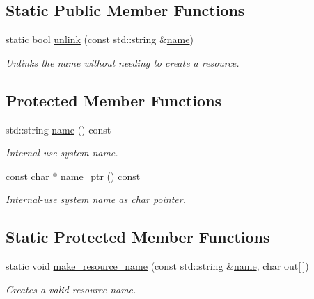 \subsection*{Static Public Member Functions}
\begin{DoxyCompactItemize}
\item 
static bool \hyperlink{classcpen333_1_1process_1_1impl_1_1named__resource__base_a47a1396cf7c8210e76431a4ba4725146}{unlink} (const std\+::string \&\hyperlink{classcpen333_1_1process_1_1impl_1_1named__resource__base_ae0c5fbb1843afe863cece4b51c38f807}{name})
\begin{DoxyCompactList}\small\item\em Unlinks the name without needing to create a resource. \end{DoxyCompactList}\end{DoxyCompactItemize}
\subsection*{Protected Member Functions}
\begin{DoxyCompactItemize}
\item 
std\+::string \hyperlink{classcpen333_1_1process_1_1impl_1_1named__resource__base_ae0c5fbb1843afe863cece4b51c38f807}{name} () const
\begin{DoxyCompactList}\small\item\em Internal-\/use system name. \end{DoxyCompactList}\item 
const char $\ast$ \hyperlink{classcpen333_1_1process_1_1impl_1_1named__resource__base_af4f2889b26cf33d0d5ed794b7e4097ab}{name\+\_\+ptr} () const
\begin{DoxyCompactList}\small\item\em Internal-\/use system name as char pointer. \end{DoxyCompactList}\end{DoxyCompactItemize}
\subsection*{Static Protected Member Functions}
\begin{DoxyCompactItemize}
\item 
static void \hyperlink{classcpen333_1_1process_1_1impl_1_1named__resource__base_a3a513fc13851a3a72b4cc5ea8aa0e104}{make\+\_\+resource\+\_\+name} (const std\+::string \&\hyperlink{classcpen333_1_1process_1_1impl_1_1named__resource__base_ae0c5fbb1843afe863cece4b51c38f807}{name}, char out\mbox{[}$\,$\mbox{]})
\begin{DoxyCompactList}\small\item\em Creates a valid resource name. \end{DoxyCompactList}\end{DoxyCompactItemize}


